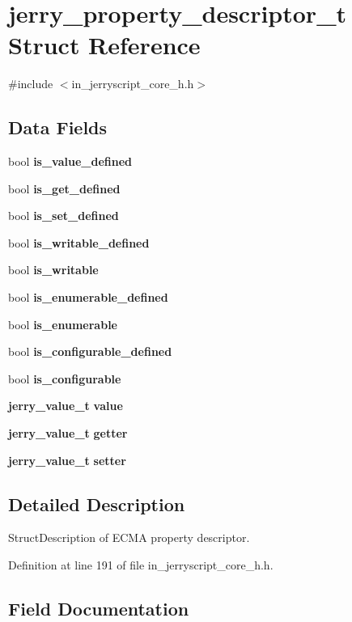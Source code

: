\section{jerry\+\_\+property\+\_\+descriptor\+\_\+t Struct Reference}
\label{structjerry__property__descriptor__t}


{\ttfamily \#include $<$in\+\_\+jerryscript\+\_\+core\+\_\+h.\+h$>$}

\subsection*{Data Fields}
\begin{DoxyCompactItemize}
\item 
bool \textbf{ is\+\_\+value\+\_\+defined}
\item 
bool \textbf{ is\+\_\+get\+\_\+defined}
\item 
bool \textbf{ is\+\_\+set\+\_\+defined}
\item 
bool \textbf{ is\+\_\+writable\+\_\+defined}
\item 
bool \textbf{ is\+\_\+writable}
\item 
bool \textbf{ is\+\_\+enumerable\+\_\+defined}
\item 
bool \textbf{ is\+\_\+enumerable}
\item 
bool \textbf{ is\+\_\+configurable\+\_\+defined}
\item 
bool \textbf{ is\+\_\+configurable}
\item 
\textbf{ jerry\+\_\+value\+\_\+t} \textbf{ value}
\item 
\textbf{ jerry\+\_\+value\+\_\+t} \textbf{ getter}
\item 
\textbf{ jerry\+\_\+value\+\_\+t} \textbf{ setter}
\end{DoxyCompactItemize}


\subsection{Detailed Description}
Struct\+Description of E\+C\+MA property descriptor. 

Definition at line 191 of file in\+\_\+jerryscript\+\_\+core\+\_\+h.\+h.



\subsection{Field Documentation}
\mbox{\label{structjerry__property__descriptor__t_a28ca24f5d4a0ad31415c9dc5eb284b00}} 
